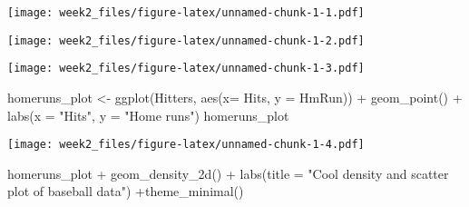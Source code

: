 \documentclass[
]{article}
\newenvironment{Shaded}{\begin{snugshade}}{\end{snugshade}}
\newcommand{\AttributeTok}[1]{\textcolor[rgb]{0.77,0.63,0.00}{#1}}
\newcommand{\FunctionTok}[1]{\textcolor[rgb]{0.00,0.00,0.00}{#1}}
\newcommand{\NormalTok}[1]{#1}
\newcommand{\OtherTok}[1]{\textcolor[rgb]{0.56,0.35,0.01}{#1}}
\newcommand{\SpecialCharTok}[1]{\textcolor[rgb]{0.00,0.00,0.00}{#1}}
\newcommand{\StringTok}[1]{\textcolor[rgb]{0.31,0.60,0.02}{#1}}
\begin{document}
\begin{Shaded}
\end{Shaded}

\texttt{[image: week2\_files/figure-latex/unnamed-chunk-1-1.pdf]}

\begin{Shaded}
\end{Shaded}

\texttt{[image: week2\_files/figure-latex/unnamed-chunk-1-2.pdf]}

\begin{Shaded}
\end{Shaded}

\texttt{[image: week2\_files/figure-latex/unnamed-chunk-1-3.pdf]}

\begin{Shaded}
\begin{Highlighting}[]
\NormalTok{  homeruns\_plot }\OtherTok{\textless{}{-}} \FunctionTok{ggplot}\NormalTok{(Hitters, }\FunctionTok{aes}\NormalTok{(}\AttributeTok{x=}\NormalTok{ Hits, }\AttributeTok{y =}\NormalTok{ HmRun)) }\SpecialCharTok{+} \FunctionTok{geom\_point}\NormalTok{() }\SpecialCharTok{+} \FunctionTok{labs}\NormalTok{(}\AttributeTok{x =} \StringTok{"Hits"}\NormalTok{, }\AttributeTok{y =} \StringTok{"Home runs"}\NormalTok{)}
\NormalTok{  homeruns\_plot}
\end{Highlighting}
\end{Shaded}

\texttt{[image: week2\_files/figure-latex/unnamed-chunk-1-4.pdf]}

\begin{Shaded}
\begin{Highlighting}[]
\NormalTok{  homeruns\_plot }\SpecialCharTok{+} \FunctionTok{geom\_density\_2d}\NormalTok{() }\SpecialCharTok{+} \FunctionTok{labs}\NormalTok{(}\AttributeTok{title =} \StringTok{"Cool density and scatter plot of baseball data"}\NormalTok{) }\SpecialCharTok{+}\FunctionTok{theme\_minimal}\NormalTok{()}
\end{Highlighting}
\end{Shaded}
\end{document}
